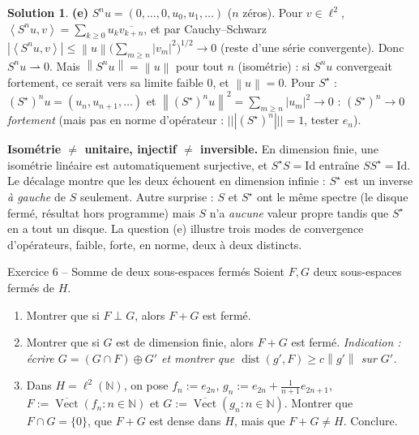 \documentclass[11pt,a4paper]{article}
\newcommand{\N}{\mathbb{N}}
\newcommand{\adh}[1]{\overline{#1}}
\newcommand{\dist}{\operatorname{dist}}
\newcommand{\Vect}{\operatorname{Vect}}
\newcommand{\norm}[1]{\left\|#1\right\|}
\newcommand{\opnorm}[1]{|\!|\!|#1|\!|\!|}
\newcommand{\ps}[2]{\left\langle #1,#2\right\rangle}
\theoremstyle{definition}
\newtheorem*{solution}{Solution}
\begin{document}
\begin{solution}
\medskip
\noindent\textbf{(e)} $S^nu=(0,\dots,0,u_0,u_1,\dots)$ ($n$ zéros). Pour $v\in\ell^2$, $\ps{S^nu}v=\sum_{k\ge0}u_k\overline{v_{k+n}}$, et par Cauchy--Schwarz $|\ps{S^nu}v|\le\norm u\big(\sum_{m\ge n}|v_m|^2\big)^{1/2}\to0$ (reste d'une série convergente). Donc $S^nu\rightharpoonup0$. Mais $\norm{S^nu}=\norm u$ pour tout $n$ (isométrie) : si $S^nu$ convergeait fortement, ce serait vers sa limite faible $0$, et $\norm u=0$. Pour $S^\star$ : $(S^\star)^nu=(u_n,u_{n+1},\dots)$ et $\norm{(S^\star)^nu}^2=\sum_{m\ge n}|u_m|^2\to0$ : \emph{$(S^\star)^n\to0$ fortement} (mais pas en norme d'opérateur : $\opnorm{(S^\star)^n}=1$, tester $e_n$).
\end{solution}

\begin{piege}
\textbf{Isométrie $\ne$ unitaire, injectif $\ne$ inversible.} En dimension finie, une isométrie linéaire est automatiquement surjective, et $S^\star S=\mathrm{Id}$ entraîne $SS^\star=\mathrm{Id}$. Le décalage montre que les deux échouent en dimension infinie : $S^\star$ est un inverse \emph{à gauche} de $S$ seulement. Autre surprise : $S$ et $S^\star$ ont le même spectre (le disque fermé, résultat hors programme) mais $S$ n'a \emph{aucune} valeur propre tandis que $S^\star$ en a tout un disque. La question (e) illustre trois modes de convergence d'opérateurs, faible, forte, en norme, deux à deux distincts.
\end{piege}

\begin{exo}{Exercice 6 -- Somme de deux sous-espaces fermés}
Soient $F,G$ deux sous-espaces fermés de $H$.
\begin{enumerate}[label=(\alph*)]
  \item Montrer que si $F\perp G$, alors $F+G$ est fermé.
  \item Montrer que si $G$ est de dimension finie, alors $F+G$ est fermé. \emph{Indication : écrire $G=(G\cap F)\oplus G'$ et montrer que $\dist(g',F)\ge c\norm{g'}$ sur $G'$.}
  \item Dans $H=\ell^2(\N)$, on pose $f_n:=e_{2n}$, $g_n:=e_{2n}+\frac1{n+1}e_{2n+1}$, $F:=\adh{\Vect}(f_n:n\in\N)$ et $G:=\adh{\Vect}(g_n:n\in\N)$. Montrer que $F\cap G=\{0\}$, que $F+G$ est dense dans $H$, mais que $F+G\ne H$. Conclure.
\end{enumerate}
\end{exo}
\end{document}
